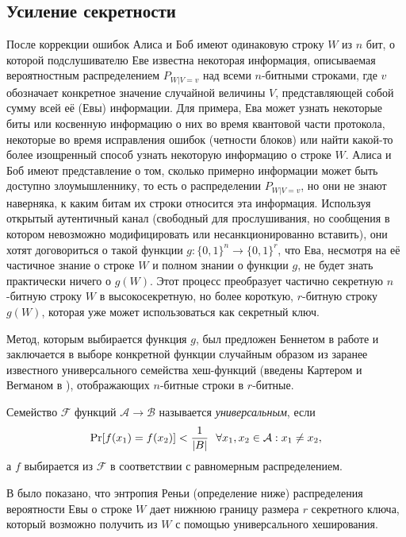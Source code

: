 \subsection{Усиление секретности}
После коррекции ошибок Алиса и Боб имеют одинаковую строку $W$ из $n$ бит, о которой подслушивателю Еве известна некоторая информация, описываемая вероятностным распределением $P_{W|V=v}$ над всеми $n$-битными строками, где $v$ обозначает конкретное значение случайной величины $V$, представляющей собой сумму всей её (Евы) информации. Для примера, Ева может узнать некоторые биты или косвенную информацию о них во время квантовой части протокола, некоторые во время исправления ошибок (четности блоков) или найти какой-то более изощренный способ узнать некоторую информацию о строке $W$. Алиса и Боб имеют представление о том, сколько примерно информации может быть доступно злоумышленнику, то есть о распределении $P_{W|V=v}$, но они не знают наверняка, к каким битам их строки относится эта информация. Используя открытый аутентичный канал (свободный для прослушивания, но сообщения в котором невозможно модифицировать или несанкционированно вставить), они хотят договориться о такой функции $g: \{0, 1\}^n \rightarrow \{
0,1\}^r$, что Ева, несмотря на её частичное знание о строке $W$ и полном знании о функции $g$, не будет знать практически ничего о $g(W)$. Этот процесс преобразует частично секретную $n$-битную строку $W$ в высокосекретную, но более короткую, $r$-битную строку $g(W)$, которая уже может использоваться как секретный ключ.

Метод, которым выбирается функция $g$, был предложен Беннетом в работе \cite{privacy_amplification_by_public_discussion} и заключается в выборе конкретной функции случайным образом из заранее известного универсального семейства хеш-функций (введены Картером и Вегманом в \cite{universal_hashing}), отображающих $n$-битные строки в $r$-битные.

\begin{definition}
  Семейство $\mathcal{F}$ функций $\mathcal{A}\rightarrow\mathcal{B}$ называется \textit{универсальным}, если 
  $$  \operatorname{Pr}[f(x_1) = f(x_2)] < \frac{1}{|B|} ~~\forall x_1, x_2 \in \mathcal{A}: x_1 \neq x_2, $$ а $f$ выбирается из $\mathcal{F}$ в соответствии с равномерным распределением.
\end{definition}

В \cite{privacy_amplification} было показано, что энтропия Реньи (определение ниже) распределения вероятности Евы о строке $W$ дает нижнюю границу размера $r$ секретного ключа, который возможно получить из $W$ с помощью универсального хеширования.

